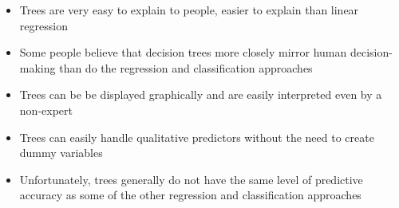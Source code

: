 \documentclass[12pt]{article}
\begin{document}
\begin{itemize}
\begin{itemize}
\item Trees are very easy to explain to people, easier to explain than linear regression
\item Some people believe that decision trees more closely mirror human decision-making than do the regression and classification approaches 
\item Trees can be be displayed graphically and are easily interpreted even by a non-expert 
\item Trees can easily handle qualitative predictors without the need to create dummy variables 
\item Unfortunately, trees generally do not have the same level of predictive accuracy as some of the other regression and classification approaches \end{itemize} 
\end{itemize}
\end{document}
